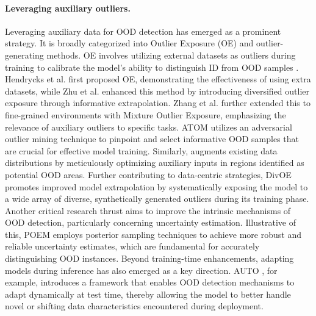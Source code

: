 \documentclass{article}
\theoremstyle{plain}
\theoremstyle{definition}
\theoremstyle{remark}
\begin{document}
\paragraph{Leveraging auxiliary outliers.}
Leveraging auxiliary data for OOD detection has emerged as a prominent strategy. It is broadly categorized into Outlier Exposure (OE) and outlier-generating methods. 
OE involves utilizing external datasets as outliers during training to calibrate the model's ability to distinguish ID from OOD samples \citep{kirchheim2022outlier, chen2021atom}. Hendrycks et al. \citep{hendrycks2018deep} first proposed OE, demonstrating the effectiveness of using extra datasets, while Zhu et al. \citep{zhu2023diversified} enhanced this method by introducing diversified outlier exposure through informative extrapolation. Zhang et al. \citep{zhang2023mixture} further extended this to fine-grained environments with Mixture Outlier Exposure, emphasizing the relevance of auxiliary outliers to specific tasks. 
ATOM \citep{chen2021atom} utilizes an adversarial outlier mining technique to pinpoint and select informative OOD samples that are crucial for effective model training. Similarly, \citet{wang2023learning} augments existing data distributions by meticulously optimizing auxiliary inputs in regions identified as potential OOD areas. Further contributing to data-centric strategies, DivOE \citep{zhu2023diversified} promotes improved model extrapolation by systematically exposing the model to a wide array of diverse, synthetically generated outliers during its training phase.
Another critical research thrust aims to improve the intrinsic mechanisms of OOD detection, particularly concerning uncertainty estimation. Illustrative of this, POEM \citep{ming2022poem} employs posterior sampling techniques to achieve more robust and reliable uncertainty estimates, which are fundamental for accurately distinguishing OOD instances. Beyond training-time enhancements, adapting models during inference has also emerged as a key direction. AUTO \citep{yang2023auto}, for example, introduces a framework that enables OOD detection mechanisms to adapt dynamically at test time, thereby allowing the model to better handle novel or shifting data characteristics encountered during deployment.
\end{document}

